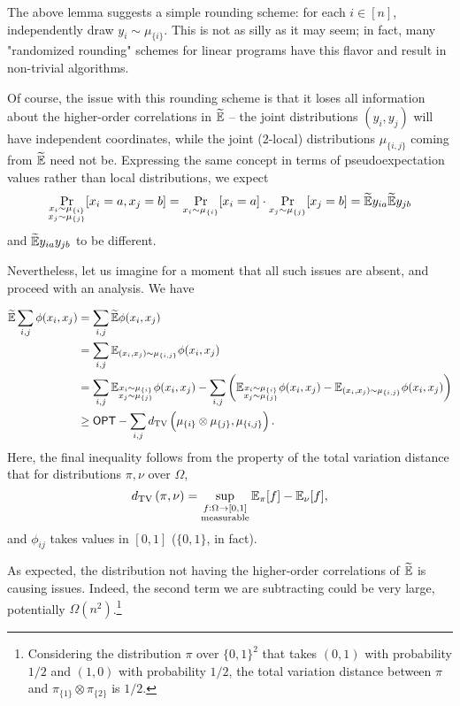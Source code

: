 \documentclass{article}
\begin{document}
The above lemma suggests a simple rounding scheme: for each $i \in [n]$, independently draw $y_i \sim \mu_{\{i\}}$. This is not as silly as it may seem; in fact, many "randomized rounding" schemes for linear programs have this flavor and result in non-trivial algorithms.

Of course, the issue with this rounding scheme is that it loses all information about the higher-order correlations in $\widetilde{\mathbb{E}}$ -- the joint distributions $(y_i,y_j)$ will have independent coordinates, while the joint ($2$-local) distributions $\mu_{\{i,j\}}$ coming from $\widetilde{\mathbb{E}}$ need not be. Expressing the same concept in terms of pseudoexpectation values rather than local distributions, we expect
\[ \Pr_{\substack{x_i \sim \mu_{\{i\}} \\ x_j \sim \mu_{\{j\}}}}[x_i = a, x_j = b] = \Pr_{x_i \sim \mu_{\{i\}}}[x_i = a] \cdot \Pr_{x_j \sim \mu_{\{j\}}}[x_j = b] = \widetilde{\mathbb{E}} y_{ia} \widetilde{\mathbb{E}} y_{jb} \]
and $\widetilde{\mathbb{E}} y_{ia} y_{jb}$ to be different.

Nevertheless, let us imagine for a moment that all such issues are absent, and proceed with an analysis. We have

\begin{align*}
	\widetilde{\mathbb{E}} \sum_{i,j} \phi(x_i,x_j) &= \sum_{i,j} \widetilde{\mathbb{E}} \phi(x_i,x_j) \\
		&= \sum_{i,j} \mathbb{E}_{(x_i,x_j) \sim \mu_{\{i,j\}}} \phi(x_i,x_j) \\
		&= \sum_{i,j} \mathbb{E}_{\substack{x_i \sim \mu_{\{i\}} \\ x_j \sim \mu_{\{j\}}}} \phi(x_i,x_j) - \sum_{i,j} \left(\mathbb{E}_{\substack{x_i \sim \mu_{\{i\}} \\ x_j \sim \mu_{\{j\}}}} \phi(x_i,x_j) - \mathbb{E}_{(x_i,x_j) \sim \mu_{\{i,j\}}} \phi(x_i,x_j)\right) \\
		&\ge \mathsf{OPT} - \sum_{i,j} d_{\mathrm{TV}}\left( \mu_{\{i\}} \otimes \mu_{\{j\}} , \mu_{\{i,j\}} \right).
\end{align*}
Here, the final inequality follows from the property of the total variation distance that for distributions $\pi,\nu$ over $\Omega$,
\[ d_{\mathrm{TV}}\left(\pi,\nu\right) = \sup_{\substack{f : \Omega \to [0,1] \\ \text{measurable}}} \mathbb{E}_{\pi}[f] - \mathbb{E}_{\nu}[f], \]
and $\phi_{ij}$ takes values in $[0,1]$ ($\{0,1\}$, in fact).

As expected, the distribution not having the higher-order correlations of $\widetilde{\mathbb{E}}$ is causing issues. Indeed, the second term we are subtracting could be very large, potentially $\Omega(n^2)$.\footnote{Considering the distribution $\pi$ over $\{0,1\}^2$ that takes $(0,1)$ with probability $1/2$ and $(1,0)$ with probability $1/2$, the total variation distance between $\pi$ and $\pi_{\{1\}} \otimes \pi_{\{2\}}$ is $1/2$.}
\end{document}
